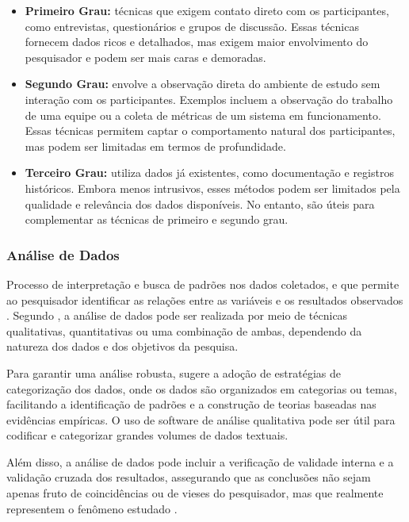 \begin{itemize}
    \item \textbf{Primeiro Grau:} técnicas que exigem contato direto com os participantes, como entrevistas, questionários e grupos de discussão. Essas técnicas fornecem dados ricos e detalhados, mas exigem maior envolvimento do pesquisador e podem ser mais caras e demoradas.
    
    \item \textbf{Segundo Grau:} envolve a observação direta do ambiente de estudo sem interação com os participantes. Exemplos incluem a observação do trabalho de uma equipe ou a coleta de métricas de um sistema em funcionamento. Essas técnicas permitem captar o comportamento natural dos participantes, mas podem ser limitadas em termos de profundidade.
    
    \item \textbf{Terceiro Grau:} utiliza dados já existentes, como documentação e registros históricos. Embora menos intrusivos, esses métodos podem ser limitados pela qualidade e relevância dos dados disponíveis. No entanto, são úteis para complementar as técnicas de primeiro e segundo grau.
\end{itemize}

\subsubsection{Análise de Dados}

Processo de interpretação e  busca de padrões nos dados coletados, e que permite ao pesquisador identificar as relações entre as variáveis e os resultados observados \cite{yin_case_study_2009}. Segundo , a análise de dados pode ser realizada por meio de técnicas qualitativas, quantitativas ou uma combinação de ambas, dependendo da natureza dos dados e dos objetivos da pesquisa.

Para garantir uma análise robusta,  sugere a adoção de estratégias de categorização dos dados, onde os dados são organizados em categorias ou temas, facilitando a identificação de padrões e a construção de teorias baseadas nas evidências empíricas. O uso de software de análise qualitativa pode ser útil para codificar e categorizar grandes volumes de dados textuais.

Além disso, a análise de dados pode incluir a verificação de validade interna e a validação cruzada dos resultados, assegurando que as conclusões não sejam apenas fruto de coincidências ou de vieses do pesquisador, mas que realmente representem o fenômeno estudado \cite{yin_case_study_2009}.


